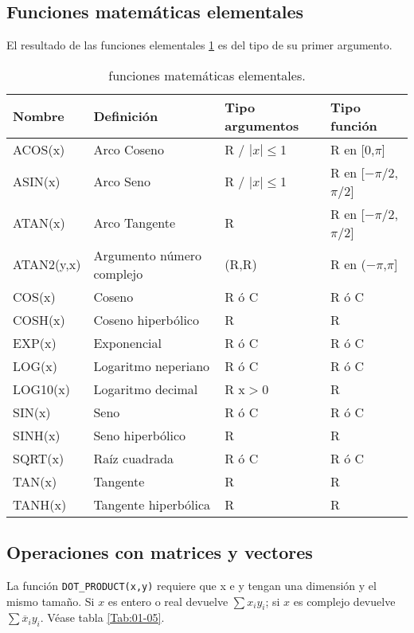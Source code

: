 \subsection{Funciones matemáticas elementales}

El resultado de las funciones elementales \ref{Tab:01-04} es del tipo de su primer argumento.

\begin{table}[h!] \centering
	\begin{tabular}{l|l|l|l}
		Nombre & Definición & Tipo argumentos & Tipo función \\ \hline
		ACOS(x) & Arco Coseno & R / $|x|\leq $1 & R en [0,$\pi$]  \\
		ASIN(x) & Arco Seno & R /  $|x|\leq $1 & R en [$-\pi/2$,$\pi/2$]  \\
		ATAN(x) & Arco Tangente & R & R en  [$-\pi/2$,$\pi/2$] \\
		ATAN2(y,x) & Argumento número complejo & (R,R) & R en  ($-\pi$,$\pi$] \\
		COS(x) & Coseno & R ó C & R ó C \\
		COSH(x) & Coseno hiperbólico & R & R \\
		EXP(x) & Exponencial & R ó C & R ó C \\
		LOG(x) & Logaritmo neperiano & R ó C & R ó C \\
		LOG10(x) & Logaritmo decimal  & R x$>$0 & R \\ 
		SIN(x) & Seno &  R ó C & R ó C \\
		SINH(x) & Seno hiperbólico & R & R \\
		SQRT(x) & Raíz cuadrada & R ó C & R ó C \\
		TAN(x)  & Tangente & R & R \\ 
		TANH(x) & Tangente hiperbólica &  R & R \\
	\end{tabular}
	\caption{funciones matemáticas elementales.}
	\label{Tab:01-04}
\end{table}


\subsection{Operaciones con matrices y vectores}

La función {\tt DOT\_PRODUCT(x,y)} requiere que x e y tengan una dimensión y el mismo tamaño. Si $x$ es entero o real devuelve $\sum x_i y_i$; si $x$ es complejo devuelve $\sum \overline{x}_i y_i$. Véase tabla \ref{Tab:01-05}.  \\

